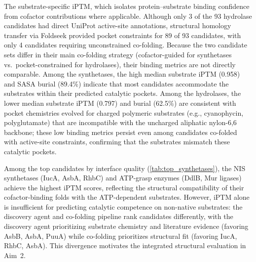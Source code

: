 \documentclass[12pt]{article}
\begin{document}
The substrate-specific iPTM, which isolates protein--substrate binding confidence from cofactor contributions where applicable. Although only 3 of the 93 hydrolase candidates had direct UniProt active-site annotations, structural homology transfer via Foldseek provided pocket constraints for 89 of 93 candidates, with only 4 candidates requiring unconstrained co-folding. Because the two candidate sets differ in their main co-folding strategy (cofactor-guided for synthetases vs.\ pocket-constrained for hydrolases), their binding metrics are not directly comparable. Among the synthetases, the high median substrate iPTM (0.958) and SASA burial (89.4\%) indicate that most candidates accommodate the substrates within their predicted catalytic pockets. Among the hydrolases, the lower median substrate iPTM (0.797) and burial (62.5\%) are consistent with pocket chemistries evolved for charged polymeric substrates (e.g., cyanophycin, polyglutamate) that are incompatible with the uncharged aliphatic nylon-6,6 backbone; these low binding metrics persist even among candidates co-folded with active-site constraints, confirming that the substrates mismatch these catalytic pockets.

Among the top candidates by interface quality (\autoref{tab:top_synthetases}), the NIS synthetases (IucA, AsbA, RhbC) and ATP-grasp enzymes (DdlB, Mur ligases) achieve the highest iPTM scores, reflecting the structural compatibility of their cofactor-binding folds with the ATP-dependent substrates. However, iPTM alone is insufficient for predicting catalytic competence on non-native substrates: the discovery agent and co-folding pipeline rank candidates differently, with the discovery agent prioritizing substrate chemistry and literature evidence (favoring AsbB, AsbA, PuuA) while co-folding prioritizes structural fit (favoring IucA, RhbC, AsbA). This divergence motivates the integrated structural evaluation in Aim~2.
\end{document}
